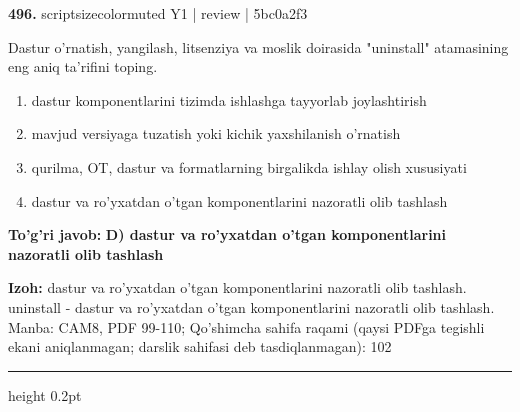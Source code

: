 \documentclass[10pt,a4paper]{article}
\begin{document}
{\bfseries\sffamily\color{ink} 496.} {scriptsizecolor{muted} Y1 | review | 5bc0a2f3}
\par
Dastur o'rnatish, yangilash, litsenziya va moslik doirasida "uninstall" atamasining eng aniq ta'rifini toping.
\begin{enumerate}[label=\Alph*),leftmargin=9mm]
\item dastur komponentlarini tizimda ishlashga tayyorlab joylashtirish
\item mavjud versiyaga tuzatish yoki kichik yaxshilanish o'rnatish
\item qurilma, OT, dastur va formatlarning birgalikda ishlay olish xususiyati
\item dastur va ro'yxatdan o'tgan komponentlarini nazoratli olib tashlash
\end{enumerate}
\begin{tcolorbox}[enhanced,breakable,colback=teal!4,colframe=teal!60!black,boxrule=0.45pt,arc=1.2mm,left=2.7mm,right=2.7mm,top=1.8mm,bottom=1.8mm,before skip=2mm,after skip=2mm]
{\bfseries\sffamily\color{teal}To'g'ri javob:} \textbf{D) dastur va ro'yxatdan o'tgan komponentlarini nazoratli olib tashlash}
\par\smallskip
{\bfseries Izoh:} dastur va ro'yxatdan o'tgan komponentlarini nazoratli olib tashlash. uninstall - dastur va ro'yxatdan o'tgan komponentlarini nazoratli olib tashlash. Manba: CAM8, PDF 99-110; Qo'shimcha sahifa raqami (qaysi PDFga tegishli ekani aniqlanmagan; darslik sahifasi deb tasdiqlanmagan): 102
\end{tcolorbox}
\vspace{2mm}\hrule height 0.2pt\vspace{3mm}
\end{document}
